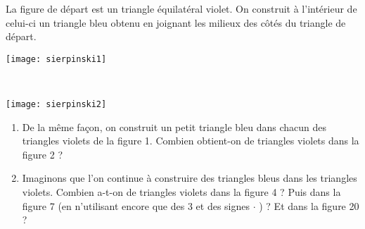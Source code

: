
\begin{activite}

\begin{partie}

 \begin{minipage}[c]{0.5\linewidth}
La figure de départ est un triangle équilatéral violet. On construit à l'intérieur de celui-ci un triangle bleu obtenu en joignant les milieux des côtés du triangle de départ.
 \end{minipage} \hfill%
 \begin{minipage}[c]{0.4\linewidth}
  \texttt{[image: sierpinski1]}
  \end{minipage} \\[1.5em]
 
 \begin{minipage}[c]{0.2\linewidth}
 \begin{center} \texttt{[image: sierpinski2]} \end{center}
 \end{minipage} \hfill%
 \begin{minipage}[c]{0.74\linewidth}
  \begin{enumerate}
   \item De la même façon, on construit un petit triangle bleu dans chacun des triangles violets de la figure 1. Combien obtient-on de triangles violets dans la figure 2 ?
   \item Imaginons que l'on continue à construire des triangles bleus dans les triangles violets. Combien a-t-on de triangles violets dans la figure 4 ? Puis dans la figure 7 (en n'utilisant encore que des 3 et des signes $\cdot$ ) ? Et dans la figure 20 ?
   \end{enumerate}
  \end{minipage} \\[1em]
  
\end{partie}



\end{activite}
